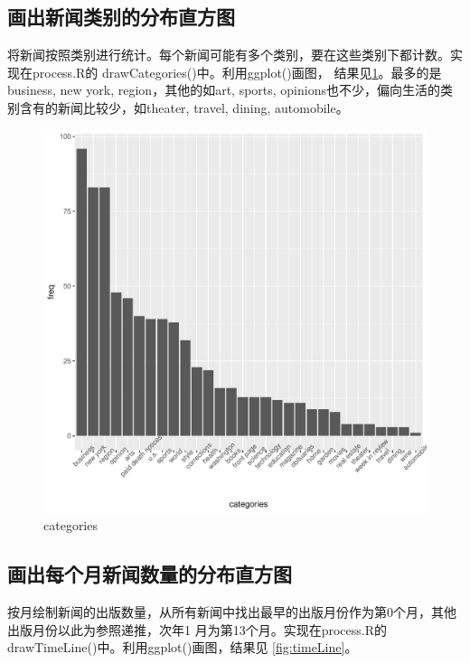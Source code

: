 \documentclass[12pt]{article}
\begin{document}
\subsection{画出新闻类别的分布直方图}
将新闻按照类别进行统计。每个新闻可能有多个类别，要在这些类别下都计数。实现在process.R的
drawCategories()中。利用ggplot()画图，
结果见\ref{fig:categories}。最多的是business, new york, region，其他的如art, sports, 
opinions也不少，偏向生活的类别含有的新闻比较少，如theater, travel, dining, automobile。
\begin{figure}[htbp]
\centering
\includegraphics[width=1.0\textwidth]{../result/categories.pdf}
\caption{categories}
\label{fig:categories}
\end{figure}

\subsection{画出每个月新闻数量的分布直方图}
按月绘制新闻的出版数量，从所有新闻中找出最早的出版月份作为第0个月，其他出版月份以此为参照递推，次年1
月为第13个月。实现在process.R的drawTimeLine()中。利用ggplot()画图，结果见
\ref{fig:timeLine}。
\end{document}
